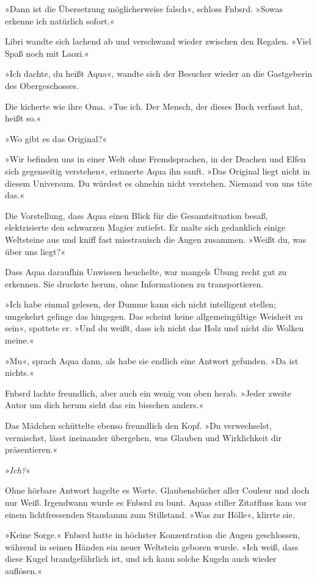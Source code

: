 »Dann ist die Übersetzung möglicherweise falsch«, schloss Fnbsrd. »Sowas erkenne ich natürlich sofort.«

Libri wandte sich lachend ab und verschwand wieder zwischen den Regalen. »Viel Spaß noch mit Laozi.«

»Ich dachte, du heißt Aqua«, wandte sich der Besucher wieder an die Gastgeberin des Obergeschosses.

Die kicherte wie ihre Oma. »Tue ich. Der Mensch, der dieses Buch verfasst hat, heißt so.«

»Wo gibt es das Original?«

»Wir befinden uns in einer Welt ohne Fremdsprachen, in der Drachen und Elfen sich gegenseitig verstehen«, erinnerte Aqua ihn sanft. »Das Original liegt nicht in diesem Universum. Du würdest es ohnehin nicht verstehen. Niemand von uns täte das.«

Die Vorstellung, dass Aqua einen Blick für die Gesamtsituation besaß, elektrisierte den schwarzen Magier zutiefst. Er malte sich gedanklich einige Weltsteine aus und kniff fast misstrauisch die Augen zusammen. »Weißt du, was über uns liegt?«

Dass Aqua daraufhin Unwissen heuchelte, war mangels Übung recht gut zu erkennen. Sie druckste herum, ohne Informationen zu transportieren.

»Ich habe einmal gelesen, der Dumme kann sich nicht intelligent stellen; umgekehrt gelinge das hingegen. Das scheint keine allgemeingültige Weisheit zu sein«, spottete er. »Und du weißt, dass ich nicht das Holz und nicht die Wolken meine.«

»Mu«, sprach Aqua dann, als habe sie endlich eine Antwort gefunden. »Da ist nichts.«

Fnbsrd lachte freundlich, aber auch ein wenig von oben herab. »Jeder zweite Autor um dich herum sieht das ein bisschen anders.«

Das Mädchen schüttelte ebenso freundlich den Kopf. »Du verwechselst, vermischst, lässt ineinander übergehen, was Glauben und Wirklichkeit dir präsentieren.«

»\emph{Ich?}«

Ohne hörbare Antwort hagelte es Worte. Glaubensbücher aller Couleur und doch nur Weiß. Irgendwann wurde es Fnbsrd zu bunt. Aquas stiller Zitatfluss kam vor einem lichtfressenden Staudamm zum Stillstand. »Was zur Hölle«, klirrte sie.

»Keine Sorge.« Fnbsrd hatte in höchster Konzentration die Augen geschlossen, während in seinen Händen ein neuer Weltstein geboren wurde. »Ich weiß, dass diese Kugel brandgefährlich ist, und ich kann solche Kugeln auch wieder auflösen.«

